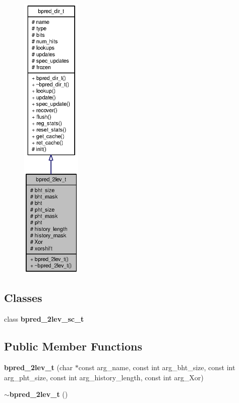 \begin{figure}[H]
\begin{center}
\leavevmode
\includegraphics[height=400pt]{classbpred__2lev__t__coll__graph}
\end{center}
\end{figure}
\subsection*{Classes}
\begin{CompactItemize}
\item 
class {\bf bpred\_\-2lev\_\-sc\_\-t}
\end{CompactItemize}
\subsection*{Public Member Functions}
\begin{CompactItemize}
\item 
{\bf bpred\_\-2lev\_\-t} (char $\ast$const arg\_\-name, const int arg\_\-bht\_\-size, const int arg\_\-pht\_\-size, const int arg\_\-history\_\-length, const int arg\_\-Xor)
\item 
{\bf $\sim$bpred\_\-2lev\_\-t} ()
\end{CompactItemize}
